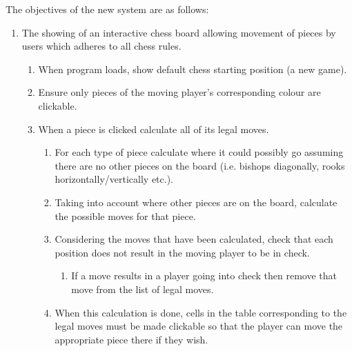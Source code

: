 \documentclass[]{report}
\begin{document}
The objectives of the new system are as follows:
\begin{enumerate}
	\item The showing of an interactive chess board allowing movement of pieces by users which adheres to all chess rules.
	\begin{enumerate}
		\item When program loads, show default chess starting position (a new game).
		\item Ensure only pieces of the moving player's corresponding colour are clickable.
		\item When a piece is clicked calculate all of its legal moves.
		\begin{enumerate}
			\item For each type of piece calculate where it could possibly go assuming there are no other pieces on the board (i.e. bishops diagonally, rooks horizontally/vertically etc.).
			\item Taking into account where other pieces are on the board, calculate the possible moves for that piece.
			\item Considering the moves that have been calculated, check that each position does not result in the moving player to be in check. 
			\begin{enumerate}
				\item If a move results in a player going into check then remove that move from the list of legal moves.
			\end{enumerate}
			\item When this calculation is done, cells in the table corresponding to the legal moves must be made clickable so that the player can move the appropriate piece there if they wish.
			

\end{enumerate}
\end{enumerate}
\end{enumerate}
\end{document}
